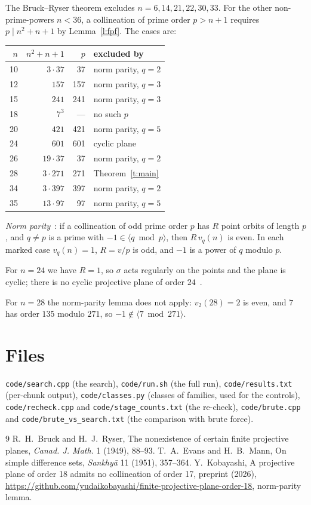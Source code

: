 \documentclass[11pt,a4paper]{article}
\theoremstyle{remark}
\begin{document}
The Bruck--Ryser theorem excludes $n=6,14,21,22,30,33$. For the other non-prime-powers $n<36$, a collineation of prime order $p>n+1$ requires $p\mid n^2+n+1$ by Lemma~\ref{l:fpf}. The cases are:
\begin{center}
\begin{tabular}{rrrl}
\toprule
$n$ & $n^2+n+1$ & $p$ & excluded by \\
\midrule
10 & $3\cdot37$ & 37 & norm parity, $q=2$ \\
12 & $157$ & 157 & norm parity, $q=3$ \\
15 & $241$ & 241 & norm parity, $q=3$ \\
18 & $7^3$ & --- & no such $p$ \\
20 & $421$ & 421 & norm parity, $q=5$ \\
24 & $601$ & 601 & cyclic plane~\cite{EM} \\
26 & $19\cdot37$ & 37 & norm parity, $q=2$ \\
28 & $3\cdot271$ & 271 & Theorem~\ref{t:main} \\
34 & $3\cdot397$ & 397 & norm parity, $q=2$ \\
35 & $13\cdot97$ & 97 & norm parity, $q=5$ \\
\bottomrule
\end{tabular}
\end{center}
\emph{Norm parity}~\cite{K18}: if a collineation of odd prime order $p$ has $R$ point orbits of length $p$, and $q\ne p$ is a prime with $-1\in\langle q\bmod p\rangle$, then $R\,v_q(n)$ is even. In each marked case $v_q(n)=1$, $R=v/p$ is odd, and $-1$ is a power of $q$ modulo $p$.

For $n=24$ we have $R=1$, so $\sigma$ acts regularly on the points and the plane is cyclic; there is no cyclic projective plane of order $24$~\cite{EM}.

For $n=28$ the norm-parity lemma does not apply: $v_2(28)=2$ is even, and $7$ has order $135$ modulo $271$, so $-1\notin\langle7\bmod271\rangle$.

\section*{Files}
\texttt{code/search.cpp} (the search), \texttt{code/run.sh} (the full run), \texttt{code/results.txt} (per-chunk output), \texttt{code/classes.py} (classes of families, used for the controls), \texttt{code/recheck.cpp} and \texttt{code/stage\_counts.txt} (the re-check), \texttt{code/brute.cpp} and \texttt{code/brute\_vs\_search.txt} (the comparison with brute force).

\begin{thebibliography}{9}
 R.~H.~Bruck and H.~J.~Ryser, The nonexistence of certain finite projective planes, \emph{Canad. J. Math.} 1 (1949), 88--93.
 T.~A.~Evans and H.~B.~Mann, On simple difference sets, \emph{Sankhy\=a} 11 (1951), 357--364.
 Y.~Kobayashi, A projective plane of order 18 admits no collineation of order 17, preprint (2026), \url{https://github.com/yudaikobayashi/finite-projective-plane-order-18}, norm-parity lemma.
\end{thebibliography}
\end{document}
